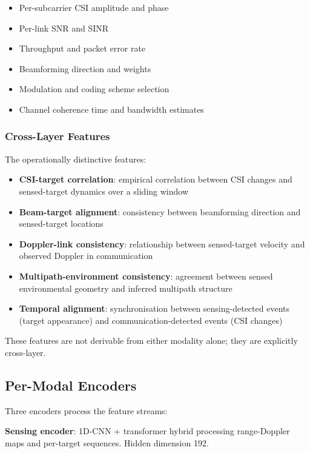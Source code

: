 \documentclass[sigconf,nonacm]{acmart}
\begin{document}
\begin{itemize}
  \item Per-subcarrier CSI amplitude and phase
  \item Per-link SNR and SINR
  \item Throughput and packet error rate
  \item Beamforming direction and weights
  \item Modulation and coding scheme selection
  \item Channel coherence time and bandwidth estimates
\end{itemize}

\subsubsection{Cross-Layer Features}

The operationally distinctive features:

\begin{itemize}
  \item \textbf{CSI-target correlation}: empirical correlation
        between CSI changes and sensed-target dynamics over a
        sliding window
  \item \textbf{Beam-target alignment}: consistency between
        beamforming direction and sensed-target locations
  \item \textbf{Doppler-link consistency}: relationship between
        sensed-target velocity and observed Doppler in
        communication
  \item \textbf{Multipath-environment consistency}: agreement
        between sensed environmental geometry and inferred
        multipath structure
  \item \textbf{Temporal alignment}: synchronisation between
        sensing-detected events (target appearance) and
        communication-detected events (CSI changes)
\end{itemize}

These features are not derivable from either modality alone;
they are explicitly cross-layer.

\subsection{Per-Modal Encoders}

Three encoders process the feature streams:

\textbf{Sensing encoder}: 1D-CNN + transformer hybrid processing
range-Doppler maps and per-target sequences. Hidden dimension
192.
\end{document}
